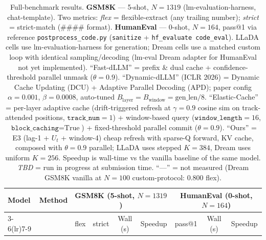 
\begin{table}[t]
\centering
\caption{Full-benchmark results.
\textbf{GSM8K} — 5-shot, $N{=}1319$ (lm-evaluation-harness, chat-template). Two metrics: \emph{flex} = flexible-extract (any trailing number); \emph{strict} = strict-match ($\texttt{\#\#\#\#}$ format).
\textbf{HumanEval} — 0-shot, $N{=}164$, pass@1 via reference \texttt{postprocess\_code.py} (\texttt{sanitize} + \texttt{hf\_evaluate code\_eval}).
LLaDA cells use lm-evaluation-harness for generation; Dream cells use a matched custom loop with identical sampling/decoding (lm-eval Dream adapter for HumanEval not yet implemented).
``Fast-dLLM'' = prefix \& dual cache + confidence-threshold parallel unmask ($\theta{=}0.9$).
``Dynamic-dLLM'' (ICLR 2026) = Dynamic Cache Updating (DCU) + Adaptive Parallel Decoding (APD); paper config $\alpha{=}0.001$, $\beta{=}0.0008$, auto-tuned $B_{\text{layer}}{=}B_{\text{window}}{=}\text{gen\_len}/8$.
``Elastic-Cache'' = per-layer adaptive cache (drift-triggered refresh at $\gamma{=}0.9$ cosine sim on track-attended positions, $\texttt{track\_num}{=}1$) + window-based query ($\texttt{window\_length}{=}16$, $\texttt{block\_caching}{=}\text{True}$) + fixed-threshold parallel commit ($\theta{=}0.9$).
``Ours'' = E3 (lag-1 + $U_t$ + window-4) cheap refresh with sparse-Q forward, KV cache, composed with $\theta{=}0.9$ parallel; LLaDA uses stepped $K{=}384$, Dream uses uniform $K{=}256$.
Speedup is wall-time vs the vanilla baseline of the same model.
\textit{TBD} = run in progress at submission time. ``---'' = not measured (Dream GSM8K vanilla at $N{=}100$ custom-protocol: 0.800 flex).}
\label{tab:main}
\small                            %
\setlength{\tabcolsep}{4pt}
\begin{tabular}{llccccccc}
\toprule
\multirow{2}{*}{Model} & \multirow{2}{*}{Method}
   & \multicolumn{4}{c}{GSM8K (5-shot, $N{=}1319$)}
   & \multicolumn{3}{c}{HumanEval (0-shot, $N{=}164$)} \\
\cmidrule(lr){3-6}\cmidrule(lr){7-9}
   &
   & flex & strict & Wall (s) & Speedup
   & pass@1   & Wall (s) & Speedup \\
\midrule

\end{tabular}
\end{table}
